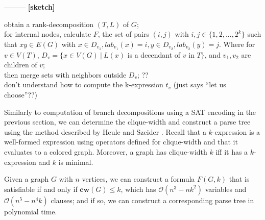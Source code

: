 \noindent
---------
\textbf{[sketch]}

obtain a rank-decomposition $(T,L)$ of $G$;\\

for internal nodes, calculate $F$, the set of pairs $(i,j)$ with $i,j \in \{1,2,...,2^k\}$ such that $xy \in E(G)$ with $x \in D_{v_1}, lab_{v_1}(x)=i, y \in D_{v_2}, lab_{v_2}(y)=j$.
Where for $v \in V(T)$, $D_v = \{ x \in V(G) \ | \ L(x)$ is a decendant of $v$ in $T \}$, and $v_1, v_2$ are children of $v$; \\

then merge sets with neighbors outside $D_v$; ?? \\

don't understand how to compute the k-expression $t_v$ (just says ``let us choose''??)
\fi


















\noindent
Similarly to computation of branch decompositions using a SAT encoding in the previous section, we can determine the clique-width and construct a parse tree using the method described by Heule and Szeider \cite{DBLP:journals/tocl/HeuleS15}.
Recall that a $k$-expression is a well-formed expression using operators defined for clique-width and that it evaluates to a colored graph.
Moreover, a graph has clique-width $k$ iff it has a $k$-expression and $k$ is minimal.

\begin{theorem}
	Given a graph $G$ with $n$ vertices, we can construct a formula $F(G,k)$ that is satisfiable if and only if $\mathbf{cw}(G) \leq k$, which has $\mathcal{O}(n^3-nk^2)$ variables and $\mathcal{O}(n^5-n^4k)$ clauses; and if so, we can construct a corresponding parse tree in polynomial time.
\end{theorem}

